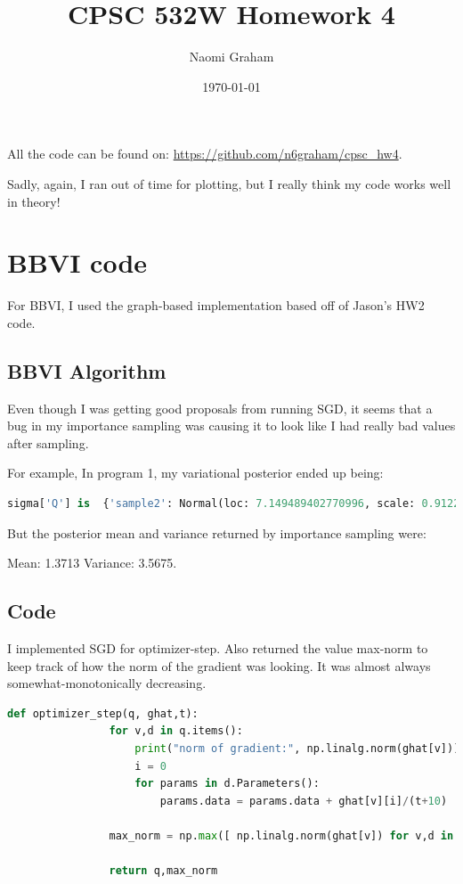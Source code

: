 \documentclass[12pt]{article}%
\theoremstyle{definition}
\begin{document}
	
	\title{CPSC 532W Homework 4}
	\author{Naomi Graham}
	\date{\today}
	\maketitle
	
	All the code can be found on: \url{https://github.com/n6graham/cpsc_hw4}.
	
	Sadly, again, I ran out of time for plotting, but I really think my code works well in theory!
	
		\section{BBVI code}
		
		
		For BBVI, I used the graph-based implementation based off of Jason's HW2 code.
		
		
		\subsection{BBVI Algorithm}
		
		Even though I was getting good proposals from running SGD, it seems that a bug in my importance sampling was causing it to look like I had really bad values after sampling.
		
		For example, In program 1, my variational posterior ended up being:
			\begin{lstlisting}[language=Python]
			sigma['Q'] is  {'sample2': Normal(loc: 7.149489402770996, scale: 0.9122980237007141)}
			\end{lstlisting}
		
		But the posterior mean and variance returned by importance sampling were:
		
		Mean: 1.3713
		Variance: 3.5675.
		
		
		\subsection{Code}
		
		I implemented SGD for optimizer-step. Also returned the value max-norm to keep track of how the norm of the gradient was looking. It was almost always somewhat-monotonically decreasing.
		
		\begin{lstlisting}[language=Python]
		def optimizer_step(q, ghat,t):
		        for v,d in q.items():
		            print("norm of gradient:", np.linalg.norm(ghat[v]))
		            i = 0
		            for params in d.Parameters():
		                params.data = params.data + ghat[v][i]/(t+10) 
		
		        max_norm = np.max([ np.linalg.norm(ghat[v]) for v,d in q.items()])
		
		        return q,max_norm
		\end{lstlisting}
		
\end{document}
